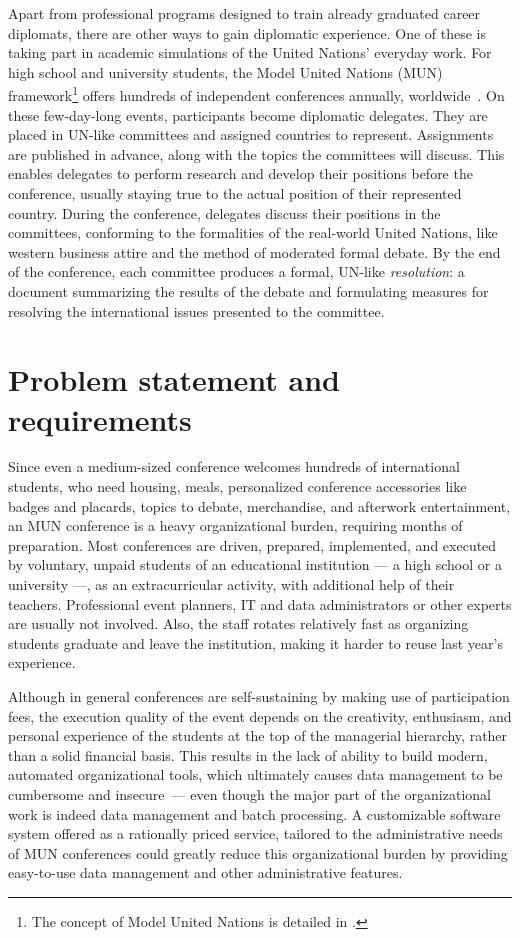 Apart from professional programs designed to train already graduated career diplomats, there are other ways to gain diplomatic experience. One of these is taking part in academic simulations of the United Nations' everyday work. For high school and university students, the Model United Nations (MUN) framework\footnote{The concept of Model United Nations is detailed in .} offers hundreds of independent conferences annually, worldwide~\cite{mymunconferencelist}. On these few-day-long events, participants become diplomatic delegates. They are placed in UN-like committees and assigned countries to represent. Assignments are published in advance, along with the topics the committees will discuss. This enables delegates to perform research and develop their positions before the conference, usually staying true to the actual position of their represented country. During the conference, delegates discuss their positions in the committees, conforming to the formalities of the real-world United Nations, like western business attire and the method of moderated formal debate. By the end of the conference, each committee produces a formal, UN-like \emph{resolution}: a document summarizing the results of the debate and formulating measures for resolving the international issues presented to the committee.

\section{Problem statement and requirements}

Since even a medium-sized conference welcomes hundreds of international students, who need housing, meals, personalized conference accessories like badges and placards, topics to debate, merchandise, and afterwork entertainment, an MUN conference is a heavy organizational burden, requiring months of preparation. Most conferences are driven, prepared, implemented, and executed by voluntary, unpaid students of an educational institution — a high school or a university —, as an extracurricular activity, with additional help of their teachers. Professional event planners, IT and data administrators or other experts are usually not involved. Also, the staff rotates relatively fast as organizing students graduate and leave the institution, making it harder to reuse last year's experience.

Although in general conferences are self-sustaining by making use of participation fees, the execution quality of the event depends on the creativity, enthusiasm, and personal experience of the students at the top of the managerial hierarchy, rather than a solid financial basis. This results in the lack of ability to build modern, automated organizational tools, which ultimately causes data management to be cumbersome and insecure — even though the major part of the organizational work is indeed data management and batch processing. A customizable software system offered as a rationally priced service, tailored to the administrative needs of MUN conferences could greatly reduce this organizational burden by providing easy-to-use data management and other administrative features.


